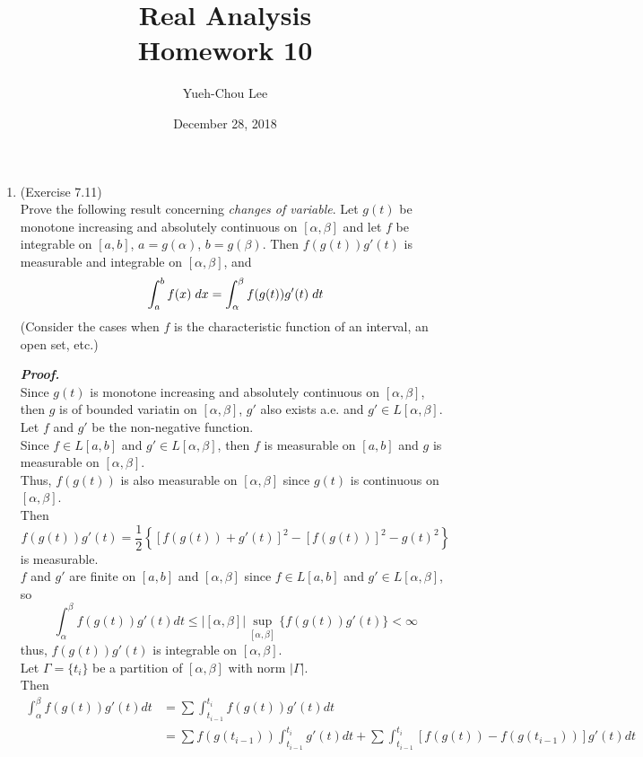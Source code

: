 \documentclass[a4paper,11pt]{article}
\title{Real Analysis \\ Homework 10}
\author{Yueh-Chou Lee}
\date{December 28, 2018}
\begin{document}
\maketitle
 \begin{enumerate}

 	\item (Exercise 7.11)\\
 		Prove the following result concerning \textit{changes of variable}. Let $g(t)$ be monotone increasing and absolutely continuous on $[\alpha,\beta]$ and let $f$ be integrable on $[a,b]$, $a = g(\alpha)$, $b = g(\beta)$. Then $f(g(t))g'(t)$ is measurable and integrable on $[\alpha,\beta]$, and
 		$$\int_a^b f(x) \hspace{0.1cm} dx = \int_\alpha^\beta f(g(t)) g'(t) \hspace{0.1cm} dt$$
 		(Consider the cases when $f$ is the characteristic function of an interval, an open set, etc.)
 		
 		\textit{\textbf {Proof.}}\\
 		Since $g(t)$ is monotone increasing and absolutely continuous on $[\alpha,\beta]$, then $g$ is of bounded variatin on $[\alpha,\beta]$, $g'$ also exists a.e. and $g' \in L[\alpha,\beta]$.\\
 		Let $f$ and $g'$ be the non-negative function.\\
 		Since $f \in L[a,b]$ and $g' \in L[\alpha, \beta]$, then $f$ is measurable on $[a,b]$ and $g$ is measurable on $[\alpha, \beta]$.\\
 		Thus, $f(g(t))$ is also measurable on $[\alpha,\beta]$ since $g(t)$ is continuous on $[\alpha,\beta]$.\\
 		Then
 		$$f(g(t)) g'(t)
 		= \frac{1}{2} \left\{ \left[ f(g(t)) + g'(t) \right]^2 - [f(g(t))]^2 - g(t)^2 \right\}$$
 		is measurable.\\
		$f$ and $g'$ are finite on $[a,b]$ and $[\alpha, \beta]$ since $f \in L[a,b]$ and $g' \in L[\alpha, \beta]$, so
		$$\int_\alpha^\beta f(g(t)) g'(t) dt
		\leq \left|[\alpha, \beta]\right| \sup_{[\alpha, \beta]}\{ f(g(t)) g'(t) \}
		< \infty$$
		thus, $f(g(t)) g'(t)$ is integrable on $[\alpha, \beta]$.\\

		Let $\Gamma = \{ t_i \}$ be a partition of $[\alpha, \beta]$ with norm $|\Gamma|$.\\
		Then
		$$\begin{aligned}
		\int_\alpha^\beta f(g(t)) g'(t) dt
		&= \sum \int_{t_{i-1}}^{t_i} f(g(t)) g'(t) dt\\
		&= \sum f(g(t_{i-1})) \int_{t_{i-1}}^{t_i} g'(t) dt
		+ \sum \int_{t_{i-1}}^{t_i} [f(g(t)) - f(g(t_{i-1}))] g'(t) dt
		\end{aligned}$$


\end{enumerate}
\end{document}
